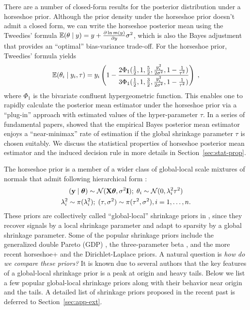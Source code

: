 \documentclass[11pt]{article}
\begin{document}
There are a number of closed-form results for the posterior distribution under a
horseshoe prior. Although the prior density under the horseshoe prior doesn't
admit a closed form, we can write the horseshoe posterior mean using the
Tweedies' formula $\mathbb E(\theta \mid y) = y + \frac{\partial \ln m(y)}{\partial y}\sigma^2$, which is also
the Bayes adjustment that provides an ``optimal'' bias-variance trade-off.
For the horseshoe prior, Tweedies' formula yields
\begin{equation}
  \mathbb E(\theta_i \mid y_i, \tau) = y_i \left( 1 - \frac{2\Phi_1(\frac{1}{2}, 1,
  \frac{5}{2},\frac{y_i^2}{2\sigma^2}, 1-\frac{1}{\tau^2})}{
  3\Phi_1(\frac{1}{2}, 1, \frac{3}{2},\frac{y_i^2}{2\sigma^2}, 1-\frac{1}{\tau^2})} \right)
  \;,
\end{equation}
where $\Phi_1$ is the bivariate confluent hypergeometric function. This
enables one to rapidly calculate the posterior mean estimator under the
horseshoe prior via a ``plug-in'' approach with estimated values of the
hyper-parameter $\tau$. In a series of fundamental papers,
\citet{van2014horseshoe,van2015conditions,van2016many,van2017adaptive} showed that the empirical Bayes posterior mean
estimator enjoys  a ``near-minimax'' rate of estimation if the global shrinkage
parameter $\tau$ is chosen suitably. We discuss the statistical properties of
horseshoe posterior mean estimator and the induced decision rule in more
details in Section~\ref{sec:stat-prop}. 

%
The horseshoe prior is a member of a wider class of global-local scale mixtures of normals that admit following hierarchical form \citep{polson2010shrink}: 
\begin{gather*}
({\bf y} \mid \boldsymbol{\theta}) \sim {\cal N}({\bf X} \boldsymbol{\theta}, \sigma^2 {\bf I}) ;\; \theta_i \sim {\cal N}(0, \lambda_i^2 \tau^2) \\
\lambda_i^2 \sim \pi(\lambda_i^2) ; \; (\tau,\sigma^2) \sim  \pi(\tau^2,\sigma^2), i = 1, \ldots, n. 
\end{gather*}
These priors are collectively called ``global-local'' shrinkage priors in
\cite{polson2010shrink}, since they recover signals by a local shrinkage
parameter and adapt to sparsity by a global shrinkage parameter. Some of the
popular shrinkage priors include the generalized double Pareto (GDP)
\citep{armagan2013generalized}, the three-parameter beta
\citep{armagan2011generalized}, and the more recent horseshoe+
\citep{bhadra2015horseshoe+} and the Dirichlet-Laplace
\citep{bhattacharya2014dirichlet} priors. A natural question is \textit{how do
we compare these priors?} It is known due to several authors
\citep[e.g.]{polson2010shrink,bhadra2015default,van2015conditions} that the key
features of a global-local shrinkage prior is a peak at origin and heavy tails.
Below we list a few popular global-local shrinkage priors along with their
behavior near origin and the tails. A detailed list of shrinkage priors
proposed in the recent past is deferred to Section~\ref{sec:app-ext}.
\end{document}

